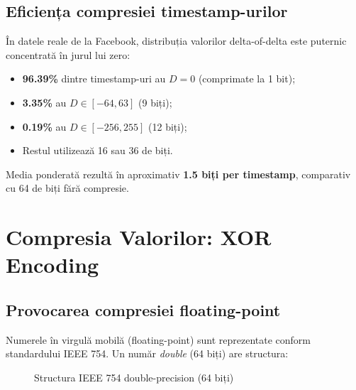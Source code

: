 \subsection{Eficiența compresiei timestamp-urilor}

În datele reale de la Facebook, distribuția valorilor delta-of-delta este puternic concentrată în jurul lui zero:

\begin{itemize}
    \item \textbf{96.39\%} dintre timestamp-uri au $D = 0$ (comprimate la 1 bit);
    \item \textbf{3.35\%} au $D \in [-64, 63]$ (9 biți);
    \item \textbf{0.19\%} au $D \in [-256, 255]$ (12 biți);
    \item Restul utilizează 16 sau 36 de biți.
\end{itemize}

Media ponderată rezultă în aproximativ \textbf{1.5 biți per timestamp}, comparativ cu 64 de biți fără compresie.

\section{Compresia Valorilor: XOR Encoding}
\label{sec:xor}

\subsection{Provocarea compresiei floating-point}

Numerele în virgulă mobilă (floating-point) sunt reprezentate conform standardului IEEE 754. Un număr \textit{double} (64 biți) are structura:

\begin{figure}[h]
\centering
{}
\caption{Structura IEEE 754 double-precision (64 biți)}
\label{fig:ieee754}
\end{figure}

